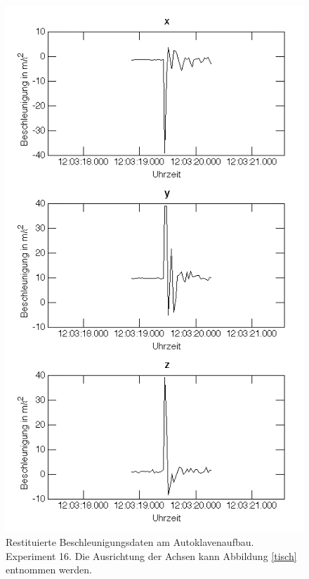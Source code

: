 \documentclass[12pt,a4paper,twoside,BCOR=12.5mm]{scrartcl}
\begin{document}
\begin{figure}[H]
\centering
\includegraphics[scale=.7]{wakiki/tischmovement3.png}
\caption{Restituierte Beschleunigungsdaten am Autoklavenaufbau. Experiment 16. Die Ausrichtung der Achsen kann Abbildung \ref{tisch} entnommen werden. }
\label{tischmovement3}
\end{figure}
\end{document}
